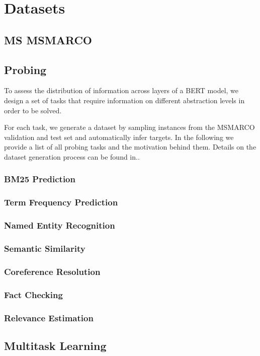 \chapter{Datasets}
\label{chap:datasets}
\section{MS MSMARCO}
\section{Probing}
To assess the distribution of information across layers of a BERT model, we design a set of tasks that require information on different abstraction levels in order to be solved.

For each task, we generate a dataset by sampling instances from the MSMARCO validation and test set and automatically infer targets. In the following we provide a list of all probing tasks and the motivation behind them. Details on the dataset generation process can be found in..

\subsection{BM25 Prediction}

\subsection{Term Frequency Prediction}

\subsection{Named Entity Recognition}

\subsection{Semantic Similarity}

\subsection{Coreference Resolution}

\subsection{Fact Checking}

\subsection{Relevance Estimation}

\section{Multitask Learning}